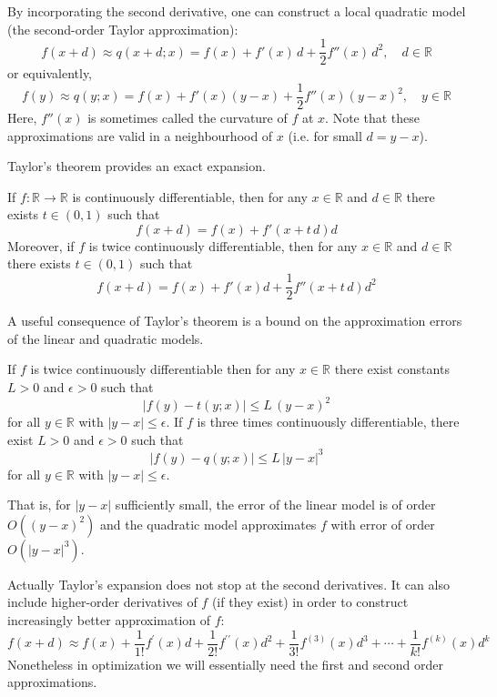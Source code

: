 \documentclass[9pt, headings=standardclasses, parskip=half]{scrartcl}
\renewcommand{\emph}[1]{\textcolor{mypurple}{#1}}
\begin{document}
By incorporating the second derivative, one can construct a local quadratic model (the second-order Taylor approximation):
\begin{equation}
f(x+d)\approx q(x+d;x)=f(x)+f'(x)\,d+\frac{1}{2}f''(x)\,d^2,\quad d\in\mathbb{R}
\end{equation}
or equivalently,
\begin{equation}\label{eq:second_order_taylor_approximation_univariate}
f(y)\approx q(y;x)=f(x)+f'(x)(y-x)+\frac{1}{2}f''(x)(y-x)^2,\quad y\in\mathbb{R}
\end{equation}
Here, \(f''(x)\) is sometimes called the \emph{curvature} of \(f\) at \(x\). Note that these approximations are valid in a neighbourhood of \(x\) (i.e. for small \(d=y-x\)).

Taylor's theorem provides an exact expansion. 

\begin{theorem}
\label{thm:univariate_taylor_expansion}
If \(f:\mathbb{R}\to\mathbb{R}\) is continuously differentiable, then for any \(x\in\mathbb{R}\) and \(d\in\mathbb{R}\) there exists \(t\in (0,1)\) such that
\[
f(x+d)=f(x)+f'\left(x+t\,d\right)d
\]
Moreover, if \(f\) is twice continuously differentiable, then for any \(x\in\mathbb{R}\) and \(d\in\mathbb{R}\) there exists \(t\in (0,1)\) such that
\[
f(x+d)=f(x)+f'(x)d+\frac{1}{2}f''\left(x+t\,d\right)d^2
\]
\end{theorem}

A useful consequence of Taylor's theorem is a bound on the approximation errors of the linear and quadratic models.

\begin{corollary}
\label{cor:approximation_error_univariate_taylor}  
If \(f\) is twice continuously differentiable then for any \(x\in\mathbb{R}\) there exist constants \(L>0\) and \(\epsilon>0\) such that
\[
\left|f(y)-t(y;x)\right|\le L\,(y-x)^2
\]
for all \(y\in\mathbb{R}\) with \(|y-x|\le\epsilon\). If \(f\) is three times continuously differentiable, there exist \(L>0\) and \(\epsilon>0\) such that
\[
\left|f(y)-q(y;x)\right|\le L\,|y-x|^3
\]
for all \(y\in\mathbb{R}\) with \(|y-x|\le\epsilon\).
\end{corollary}

That is, for \(|y-x|\) sufficiently small, the error of the linear model is of order \(O\left((y-x)^2\right)\) and the quadratic model approximates \(f\) with error of order \(O\left(|y-x|^3\right)\).


Actually Taylor's expansion does not stop at the second derivatives. It can also include higher-order derivatives of $f$ (if they exist) in order to construct increasingly better approximation of $f$:
$$
f(x+d) \approx f(x)+\frac{1}{1!} f^{\prime}(x) d+\frac{1}{2!} f^{\prime \prime}(x) d^2+\frac{1}{3!} f^{(3)}(x) d^3+\cdots+\frac{1}{k!} f^{(k)}(x) d^k
$$
Nonetheless in optimization we will essentially need the first and second order approximations.
\end{document}

